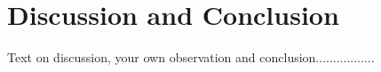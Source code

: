 \section*{Discussion and Conclusion}
Text on discussion, your own observation and conclusion.................
